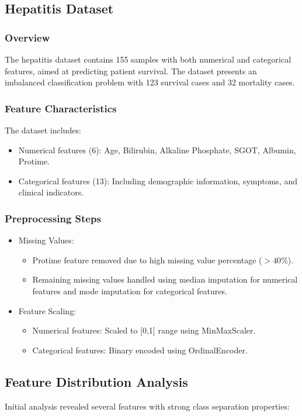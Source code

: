 \subsection{Hepatitis Dataset}
\subsubsection{Overview}
The hepatitis dataset contains 155 samples with both numerical and categorical features, aimed at predicting patient survival. The dataset presents an imbalanced classification problem with 123 survival cases and 32 mortality cases.

\subsubsection{Feature Characteristics}


The dataset includes:
\begin{itemize}
	\item Numerical features (6): Age, Bilirubin, Alkaline Phosphate, SGOT, Albumin, Protime.
	\item Categorical features (13): Including demographic information, symptoms, and clinical indicators.
\end{itemize}

\subsubsection{Preprocessing Steps}
\begin{itemize}
	\item Missing Values:
	\begin{itemize}
		\item Protime feature removed due to high missing value percentage ($>40\%$).
		\item Remaining missing values handled using median imputation for numerical features and mode imputation for categorical features.
	\end{itemize}
	\item Feature Scaling:
	\begin{itemize}
		\item Numerical features: Scaled to [0,1] range using MinMaxScaler.
		\item Categorical features: Binary encoded using OrdinalEncoder.
	\end{itemize}
\end{itemize}

\subsection{Feature Distribution Analysis}
Initial analysis revealed several features with strong class separation properties:

